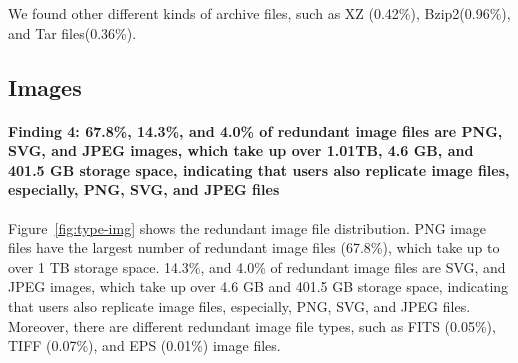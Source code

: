 We found other different kinds of archive files, such as XZ (0.42\%), Bzip2(0.96\%), and Tar files(0.36\%).

\subsection{Images}
\paragraph{Finding 4: 67.8\%, 14.3\%, and 4.0\% of redundant image files are PNG, SVG, and JPEG images, which take up over 1.01TB, 4.6 GB, and 401.5 GB storage space, indicating that users also replicate image files, especially, PNG, SVG, and JPEG files}

Figure~\ref{fig:type-img} shows the redundant image file distribution. PNG image files have the largest number of redundant image files (67.8\%), which take up to over 1 TB storage space. 14.3\%, and 4.0\% of redundant image files are SVG, and JPEG images, which take up over 4.6 GB and 401.5 GB storage space, indicating that users also replicate image files, especially, PNG, SVG, and JPEG files. Moreover, there are different redundant image file types, such as FITS (0.05\%), TIFF (0.07\%), and EPS (0.01\%) image files.




